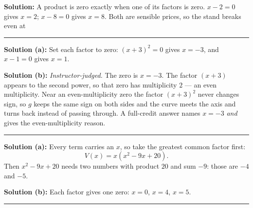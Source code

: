 \documentclass[12pt]{article}
\begin{document}



\textbf{Solution:} A product is zero exactly when one of its factors is zero.
$x - 2 = 0$ gives $x = 2$; $x - 8 = 0$ gives $x = 8$. Both are sensible prices,
so the stand breaks even at 

\vspace{0.25cm}\noindent\rule{\linewidth}{0.2pt}\vspace{0.25cm}


\textbf{Solution (a):} Set each factor to zero: $(x+3)^2 = 0$ gives $x = -3$, and
$x - 1 = 0$ gives $x = 1$. 

\textbf{Solution (b):} \emph{Instructor-judged.} The zero is $x = -3$. The factor
$(x+3)$ appears to the second power, so that zero has multiplicity $2$ --- an even
multiplicity. Near an even-multiplicity zero the factor $(x+3)^2$ never changes
sign, so $g$ keeps the same sign on both sides and the curve meets the axis and
turns back instead of passing through. A full-credit answer names $x = -3$
\emph{and} gives the even-multiplicity reason.

\vspace{0.25cm}\noindent\rule{\linewidth}{0.2pt}\vspace{0.25cm}


\textbf{Solution (a):} Every term carries an $x$, so take the greatest common
factor first:
\[ V(x) = x\left(x^2 - 9x + 20\right). \]
Then $x^2 - 9x + 20$ needs two numbers with product $20$ and sum $-9$: those are
$-4$ and $-5$. 

\textbf{Solution (b):} Each factor gives one zero: $x = 0$, $x = 4$, $x = 5$.

\vspace{0.25cm}\noindent\rule{\linewidth}{0.2pt}\vspace{0.25cm}

\end{document}
